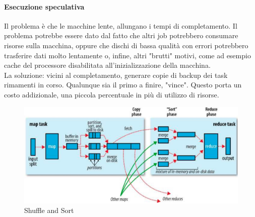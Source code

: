 \documentclass{article}
\begin{document}
\begin{appendices}
\begin{itemize}
\end{itemize}

\paragraph{Esecuzione speculativa}
Il problema è che le macchine lente, allungano i tempi di completamento. Il problema potrebbe essere dato dal fatto che altri job potrebbero consumare risorse sulla macchina, oppure che dischi di bassa qualità con errori potrebbero trasferire dati molto lentamente o, infine, altri "brutti" motivi, come ad esempio cache del processore disabilitata all'inizializzazione della macchina. \\
La soluzione: vicini al completamento, generare copie di backup dei task rimamenti in corso. Qualunque sia il primo a finire, "vince". Questo porta un costo addizionale, una piccola percentuale in più di utilizzo di risorse. 

\begin{figure}[H]
    \centering
    \includegraphics[scale=0.2]{img/shuffle e sort.png}
    \caption{Shuffle and Sort}
\end{figure}\noindent

\newpage

\end{appendices}
\end{document}
